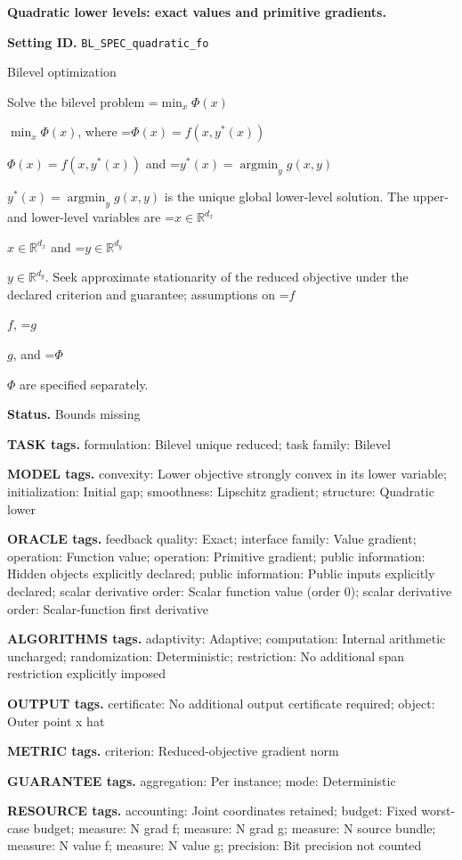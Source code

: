 \documentclass[10pt,a4paper]{article}
\newcommand{\AtlasMath}[1]{\par\begingroup\centering\setbox0=\hbox{$\displaystyle #1$}\ifdim\wd0>1.4\linewidth\typeout{ATLAS WIDE FORMULA: \the\wd0}\fi\ifdim\wd0>\linewidth\resizebox{\linewidth}{!}{\box0}\else\box0\fi\par\endgroup}
\newcommand{\AtlasInlineMath}[1]{\begingroup\setbox0=\hbox{$#1$}\ifdim\wd0>.4\linewidth\endgroup\AtlasMath{#1}\else\endgroup$#1$\fi}
\begin{document}
\raggedright

{\LARGE\bfseries\sffamily\color{AtlasNavy} Quadratic lower levels: exact values and primitive gradients.\par}\vspace{5pt}
\textbf{Setting ID.} \texttt{BL\_\allowbreak{}SPEC\_\allowbreak{}quadratic\_\allowbreak{}fo}

Bilevel optimization

Solve the bilevel problem \AtlasInlineMath{\min_x\Phi(x)}, where \AtlasInlineMath{\Phi(x)=f(x,y^*(x))} and \AtlasInlineMath{y^*(x)=\operatorname*{argmin}_y g(x,y)} is the unique global lower-level solution. The upper- and lower-level variables are \AtlasInlineMath{x\in\mathbb{R}^{d_x}} and \AtlasInlineMath{y\in\mathbb{R}^{d_y}}. Seek approximate stationarity of the reduced objective under the declared criterion and guarantee; assumptions on \AtlasInlineMath{f}, \AtlasInlineMath{g}, and \AtlasInlineMath{\Phi} are specified separately.

\textbf{Status.} Bounds missing

\textbf{TASK tags.} formulation: Bilevel unique reduced; task family: Bilevel

\textbf{MODEL tags.} convexity: Lower objective strongly convex in its lower variable; initialization: Initial gap; smoothness: Lipschitz gradient; structure: Quadratic lower

\textbf{ORACLE tags.} feedback quality: Exact; interface family: Value gradient; operation: Function value; operation: Primitive gradient; public information: Hidden objects explicitly declared; public information: Public inputs explicitly declared; scalar derivative order: Scalar function value (order 0); scalar derivative order: Scalar-function first derivative

\textbf{ALGORITHMS tags.} adaptivity: Adaptive; computation: Internal arithmetic uncharged; randomization: Deterministic; restriction: No additional span restriction explicitly imposed

\textbf{OUTPUT tags.} certificate: No additional output certificate required; object: Outer point x hat

\textbf{METRIC tags.} criterion: Reduced-objective gradient norm

\textbf{GUARANTEE tags.} aggregation: Per instance; mode: Deterministic

\textbf{RESOURCE tags.} accounting: Joint coordinates retained; budget: Fixed worst-case budget; measure: N grad f; measure: N grad g; measure: N source bundle; measure: N value f; measure: N value g; precision: Bit precision not counted
\end{document}
